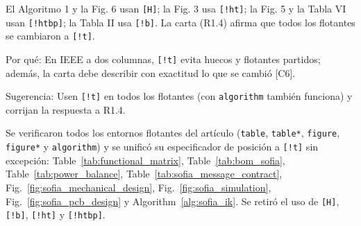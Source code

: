 \documentclass{LabDSTresponse}
\begin{document}
{El Algoritmo 1 y la Fig. 6 usan \texttt{[H]}; la Fig. 3 usa \texttt{[!ht]}; la Fig. 5 y la Tabla VI usan \texttt{[!htbp]}; la Tabla II usa \texttt{[!b]}. La carta (R1.4) afirma que todos los flotantes se cambiaron a \texttt{[!t]}.

Por qué: En IEEE a dos columnas, \texttt{[!t]} evita huecos y flotantes partidos; además, la carta debe describir con exactitud lo que se cambió [C6].

Sugerencia: Usen \texttt{[!t]} en todos los flotantes (con \texttt{algorithm} también funciona) y corrijan la respuesta a R1.4.}
{Se verificaron todos los entornos flotantes del artículo (\texttt{table}, \texttt{table*}, \texttt{figure}, \texttt{figure*} y \texttt{algorithm}) y se unificó su especificador de posición a \texttt{[!t]} sin excepción: Table~\ref{tab:functional_matrix}, Table~\ref{tab:bom_sofia}, Table~\ref{tab:power_balance}, Table~\ref{tab:sofia_message_contract}, Fig.~\ref{fig:sofia_mechanical_design}, Fig.~\ref{fig:sofia_simulation}, Fig.~\ref{fig:sofia_pcb_design} y Algorithm~\ref{alg:sofia_ik}. Se retiró el uso de \texttt{[H]}, \texttt{[!b]}, \texttt{[!ht]} y \texttt{[!htbp]}.}
\end{document}
